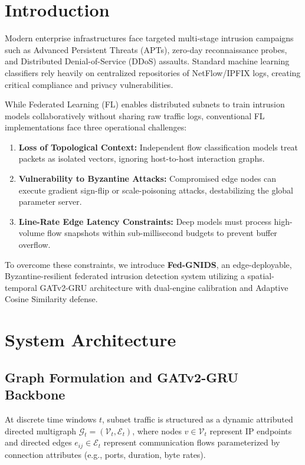 \documentclass[conference]{IEEEtran}
\begin{document}
\section{Introduction}
Modern enterprise infrastructures face targeted multi-stage intrusion campaigns such as Advanced Persistent Threats (APTs), zero-day reconnaissance probes, and Distributed Denial-of-Service (DDoS) assaults. Standard machine learning classifiers rely heavily on centralized repositories of NetFlow/IPFIX logs, creating critical compliance and privacy vulnerabilities.

While Federated Learning (FL) enables distributed subnets to train intrusion models collaboratively without sharing raw traffic logs, conventional FL implementations face three operational challenges:
\begin{enumerate}
    \item \textbf{Loss of Topological Context:} Independent flow classification models treat packets as isolated vectors, ignoring host-to-host interaction graphs.
    \item \textbf{Vulnerability to Byzantine Attacks:} Compromised edge nodes can execute gradient sign-flip or scale-poisoning attacks, destabilizing the global parameter server.
    \item \textbf{Line-Rate Edge Latency Constraints:} Deep models must process high-volume flow snapshots within sub-millisecond budgets to prevent buffer overflow.
\end{enumerate}

To overcome these constraints, we introduce \textbf{Fed-GNIDS}, an edge-deployable, Byzantine-resilient federated intrusion detection system utilizing a spatial-temporal GATv2-GRU architecture with dual-engine calibration and Adaptive Cosine Similarity defense.

\section{System Architecture}

\subsection{Graph Formulation and GATv2-GRU Backbone}
At discrete time windows $t$, subnet traffic is structured as a dynamic attributed directed multigraph $\mathcal{G}_t = (\mathcal{V}_t, \mathcal{E}_t)$, where nodes $v \in \mathcal{V}_t$ represent IP endpoints and directed edges $e_{ij} \in \mathcal{E}_t$ represent communication flows parameterized by connection attributes (e.g., ports, duration, byte rates).
\end{document}
